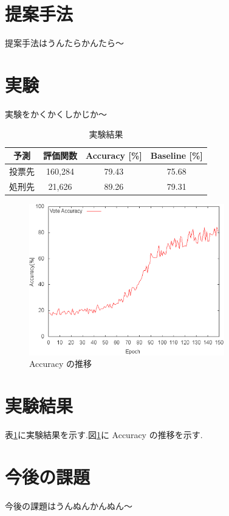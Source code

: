 \documentclass[twocolumn]{jarticle}     %
\begin{document}
\section{提案手法}
提案手法はうんたらかんたら〜

\section{実験}
実験をかくかくしかじか〜

\begin{table}[hbtp]
  \caption{実験結果}
  \label{table:result}
  \centering
  \begin{tabular}{c|ccc}
    \hline
    予測 & 評価関数  & Accuracy [\%]  &  Baseline [\%]  \\
    \hline 
    投票先 & 160,284  & 79.43  & 75.68 \\
    処刑先 & 21,626  & 89.26  & 79.31 \\
    \hline
  \end{tabular}
\end{table}

\begin{figure}[htbp]
  \centering
  \includegraphics[width=85mm]{assets/accuracy.eps}
  \caption{Accuracy の推移}
  \label{fig:Accuracy}
\end{figure}

\section{実験結果}
表\ref{table:result}に実験結果を示す.図\ref{fig:Accuracy}に Accuracy の推移を示す.

\section{今後の課題}
今後の課題はうんぬんかんぬん〜


\end{document}
